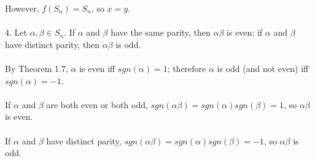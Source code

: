 \documentclass{article}
\begin{document}
\begin{siderules}
\null\qquad However, \(f(S_n)=S_n\), so \(x=y\).\\\\
\color{blue}4. Let \(\alpha,\beta\in S_n\). If \(\alpha\) and \(\beta\) have the same parity, then \(\alpha\beta\) is even; if \(\alpha\) and \(\beta\) have distinct parity, then \(\alpha\beta\) is odd.\\\\\color{black}
\null\qquad By \color{gray}Theorem 1.7\color{black}, \(\alpha\) is even iff \(sgn(\alpha)=1\); therefore \(\alpha\) is odd (and not even) iff \(sgn(\alpha)=-1\).\\\\
\null\qquad If \(\alpha\) and \(\beta\) are both even or both odd, \(sgn(\alpha\beta)=sgn(\alpha)sgn(\beta)=1\), so \(\alpha\beta\) is even.\\\\
\null\qquad If \(\alpha\) and \(\beta\) have distinct parity, \(sgn(\alpha\beta)=sgn(\alpha)sgn(\beta)=-1\), so \(\alpha\beta\) is odd.
\end{siderules}
\end{document}
